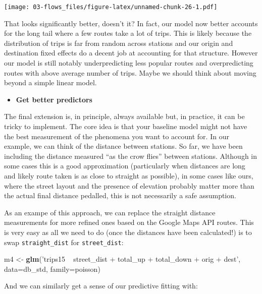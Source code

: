 \documentclass[]{book}
\newenvironment{Shaded}{\begin{snugshade}}{\end{snugshade}}
\newcommand{\DataTypeTok}[1]{\textcolor[rgb]{0.13,0.29,0.53}{#1}}
\newcommand{\KeywordTok}[1]{\textcolor[rgb]{0.13,0.29,0.53}{\textbf{#1}}}
\newcommand{\NormalTok}[1]{#1}
\newcommand{\StringTok}[1]{\textcolor[rgb]{0.31,0.60,0.02}{#1}}
\providecommand{\tightlist}{%
  \setlength{\itemsep}{0pt}\setlength{\parskip}{0pt}}
\begin{document}
\texttt{[image: 03-flows\_files/figure-latex/unnamed-chunk-26-1.pdf]}

That looks significantly better, doesn't it? In fact, our model now better accounts for the long tail where a few routes take a lot of trips. This is likely because the distribution of trips is far from random across stations and our origin and destination fixed effects do a decent job at accounting for that structure. However our model is still notably underpredicting less popular routes and overpredicting routes with above average number of trips. Maybe we should think about moving beyond a simple linear model.

\begin{itemize}
\tightlist
\item
  \textbf{Get better predictors}
\end{itemize}

The final extension is, in principle, always available but, in practice, it can be tricky to implement. The core idea is that your baseline model might not have the best measurement of the phenomena you want to account for. In our example, we can think of the distance between stations. So far, we have been including the distance measured ``as the crow flies'' between stations. Although in some cases this is a good approximation (particularly when distances are long and likely route taken is as close to straight as possible), in some cases like ours, where the street layout and the presence of elevation probably matter more than the actual final distance pedalled, this is not necessarily a safe assumption.

As an exampe of this approach, we can replace the straight distance measurements for more refined ones based on the Google Maps API routes. This is very easy as all we need to do (once the distances have been calculated!) is to swap \texttt{straight\_dist} for \texttt{street\_dist}:

\begin{Shaded}
\begin{Highlighting}[]
\NormalTok{m4 <-}\StringTok{ }\KeywordTok{glm}\NormalTok{(}\StringTok{'trips15 ~ street_dist + total_up + total_down + orig + dest'}\NormalTok{, }
          \DataTypeTok{data=}\NormalTok{db_std,}
          \DataTypeTok{family=}\NormalTok{poisson)}
\end{Highlighting}
\end{Shaded}

And we can similarly get a sense of our predictive fitting with:
\end{document}
